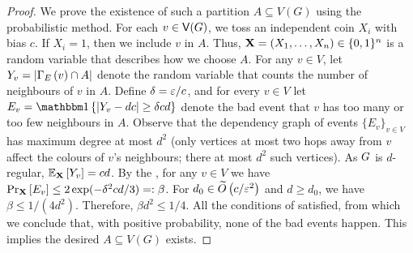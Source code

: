 \documentclass[11pt]{article}
\begin{document}
\begin{proof}
We prove the existence of such a partition $A \subseteq V(G)$ using the probabilistic method.
For each $v \in \Vertices{\Graph}$, we toss an independent coin $X_i$ with bias $c$.
If $X_i = 1$, then we include $v$ in $A$. Thus, $\vec{X} \Def (X_1, \dots, X_n) \in \bit^n$ is a random variable that describes how we choose $A$. For any $v \in V$, let $Y_v \Def |\Neighbourhood{E}{v} \cap \RedA|$ denote the random variable that counts the number of neighbours of $v$ in $A$.
Define $\delta \Def \epsilon / c$, and for every $v \in V$ let $E_v = \Indicator{|Y_v - d c | \geq \delta c d}$ denote the bad event that $v$ has too many or too few neighbours in $A$.
Observe that the dependency graph of events $\{ E_v \}_{v \in V}$ has maximum degree at most $d^2$ (only vertices at most two hops away from $v$ affect the colours of $v$'s neighbours; there at most $d^2$ such vertices).
As $\Graph$ is $d$-regular, $\Mean{\vec{X}}{Y_v} = c d$. By the , for any $v \in V$ we have $\PProb{E_v}{\vec{X}} \leq 2\exp(-\delta^2c d/3) =: \beta$.
For $d_0 \in \BigOTilde{c/\epsilon^2}$ and $d \ge d_0$, we have $\beta \leq 1/(4d^2)$.
Therefore, $\beta d^2 \leq 1/4$. All the conditions of  satisfied, from which we conclude that, with positive probability, none of the bad events happen. This implies the desired $A \subseteq V(G)$ exists.
\end{proof}


\end{document}
